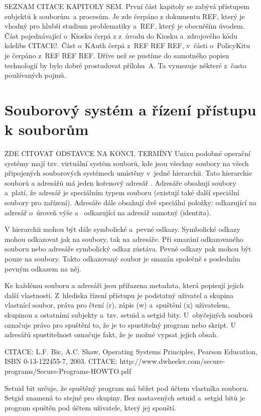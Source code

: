 SEZNAM CITACE KAPITOLY SEM. První část kapitoly se zabývá přístupem subjektů k souborům~a procesům. Je zde čerpáno z dokumentu REF, který je vhodný pro hlubší studium problematiky a~REF, který je obecněším úvodem. Část pojednávající o~Kiosku čerpá z z~úvodu do Kiosku \cite{Kioskintro} a~zdrojového kódu kdelibs CITACE!. Část o~KAuth čerpá z~REF REF REF, v~části o~PolicyKitu je čerpáno z~REF REF REF. Dříve než se pustíme do samotného popisu technologií by bylo dobré prostudovat přílohu~A. Ta vymezuje některé z~často používaných pojmů.

\section{Souborový systém a řízení přístupu k souborům}
ZDE CITOVAT ODSTAVCE NA KONCI, TERMÍNY
Unixu podobné operační systémy mají tzv. virtuální systém souborů, kde jsou všechny soubory na všech připojených souborových systémech umístěny v~jedné hierarchii. Tato hierarchie souborů a adresářů má jeden kořenový adresář \uv{/}. Adresáře obsahují soubory a~platí, že adresář je speciálním typem souboru (existují také další speciální soubory pro zařízení). Adresáře dále obsahují dvě speciální položky:  odkazující na adresář o~úroveň výše a~ odkazující na adresář samotný (identita).

V hierarchii mohou být dále symbolické a~pevné odkazy. Symbolické odkazy mohou odkazovat jak na soubory, tak na adresáře. Při smazání odkazovaného souboru nebo adresáře symbolický odkaz zůstáva. Pevné odkazy pak mohou být pouze na soubory. Takto odkazovaný soubor je smazán společně s posledním pevným odkazem na něj.

Ke každému souboru a adresáři jsou přiřazena metadata, která popisují jejich další vlastnosti. Z~hlediska řízení přístupu je podstatný uživatel a skupina vlastnící soubor, práva pro čtení (r), zápis (w) a~spuštění (x) uživatelem, skupinou a ostatními subjekty a~tzv. setuid a setgid bity. U~obyčejných souborů označuje právo pro spuštění to, že je to spustitelný program nebo skript. U adresářů spustitelnost označuje fakt, že je možné vypsat jejich obsah.

CITACE: L.F. Bic, A.C. Shaw, Operating Systems Principles, Pearson Education, ISBN 0-13-122455-7, 2003.
CITACE: http://www.dwheeler.com/secure-programs/Secure-Programs-HOWTO.pdf

Setuid bit určuje, že spuštěný program má běžet pod účtem vlastníka souboru. Setgid znamená to stejné pro skupiny. Bez nastavených setuid a~setgid bitů je program spuštěn pod účtem uživatele, který jej spouští.

